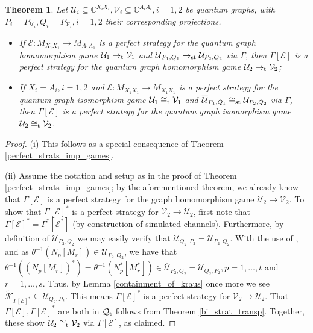 \documentclass[11pt]{amsart}
\newtheorem{theorem}{Theorem}[section]
\newcommand{\cl}[1]{\mathcal{#1}}
\newcommand{\bb}[1]{\mathbb{#1}}
\begin{document}
\begin{theorem}\label{graph_isomorphism_game}
Let $\cl{U}_{i} \subseteq \bb{C}^{X_{i}X_{i}}, \cl{V}_{i} \subseteq \bb{C}^{A_{i}A_{i}}, i = 1, 2$ be quantum graphs, with $P_{i} = P_{\cl{U}_{i}}, Q_{i} = P_{\cl{V}_{i}}, i = 1, 2$ their corresponding projections. 
\begin{itemize}
	\item[(i)] If $\cl{E}: M_{X_{1}X_{1}}\rightarrow M_{A_{1}A_{1}}$ is a perfect strategy for the quantum graph homomorphism game $\cl{U}_{1} \rightarrow_{\rm t} \cl{V}_{1}$ and $\overline{\cl{U}}_{P_{1}, Q_{1}} \rightarrow_{\rm st} \cl{U}_{P_{2}, Q_{2}}$ via $\Gamma$, then $\Gamma[\cl{E}]$ is a perfect strategy for the quantum graph homomorphism game $\cl{U}_{2} \rightarrow_{\rm t} \cl{V}_{2}$;
	\item[(ii)] If $X_{i} = A_{i}, i = 1, 2$ and $\cl{E}: M_{X_{1}X_{1}}\rightarrow M_{X_{1}X_{1}}$ is a perfect strategy for the quantum graph isomorphism game $\cl{U}_{1} \cong_{\rm t} \cl{V}_{1}$ and $\overline{\cl{U}}_{P_{1}, Q_{1}} \cong_{\rm st} \cl{U}_{P_{2}, Q_{2}}$ via $\Gamma$, then $\Gamma[\cl{E}]$ is a perfect strategy for the quantum graph isomorphism game $\cl{U}_{2} \cong_{\rm t} \cl{V}_{2}$. 
\end{itemize}
\end{theorem}
\begin{proof}
(i) This follows as a special consequence of Theorem \ref{perfect_strats_imp_games}.

(ii) Assume the notation and setup as in the proof of Theorem \ref{perfect_strats_imp_games}; by the aforementioned theorem, we already know that $\Gamma[\cl{E}]$ is a perfect strategy for the graph homomorphism game $\cl{U}_{2}\rightarrow \cl{V}_{2}$. To show that $\Gamma[\cl{E}]^{*}$ is a perfect strategy for $\cl{V}_{2}\rightarrow \cl{U}_{2}$, first note that $\Gamma[\cl{E}]^{*} = \Gamma^{*}[\cl{E}^{*}]$ (by construction of simulated channels). Furthermore, by definition of $\cl{U}_{P_{2}, Q_{2}}$ we may easily verify that $\cl{U}_{Q_{2}, P_{2}} = \overline{\cl{U}}_{P_{2}, Q_{2}}$. With the use of \cite[Lemma 2.1]{gt_two}, and as $\theta^{-1}(N_{p}[M_{r}]) \in \cl{U}_{P_{2}, Q_{2}}$, we have that $\theta^{-1}((N_{p}[M_{r}])^{*}) = \theta^{-1}(N_{p}^{*}[M_{r}^{*}]) \in \overline{\cl{U}}_{P_{2}, Q_{2}} = \cl{U}_{Q_{2}, P_{2}}, p = 1, \hdots, t$ and $r = 1, \hdots, s$. Thus, by Lemma \ref{containment_of_kraus} once more we see $\tilde{\cl{K}}_{\Gamma[\cl{E}]^{*}} \subseteq \tilde{\cl{U}}_{Q_{2}, P_{2}}$. This means $\Gamma[\cl{E}]^{*}$ is a perfect strategy for $\cl{V}_{2}\rightarrow \cl{U}_{2}$. That $\Gamma[\cl{E}], \Gamma[\cl{E}]^{*}$ are both in $\cl{Q}_{\rm t}$ follows from Theorem \ref{bi_strat_transp}. Together, these show $\cl{U}_{2} \cong_{\rm t} \cl{V}_{2}$ via $\Gamma[\cl{E}]$, as claimed. 
\end{proof}
\newpage
\end{document}
